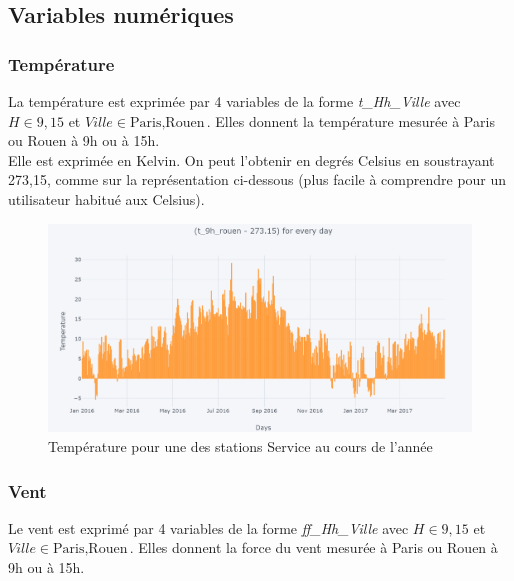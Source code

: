\documentclass{article} %
\begin{document}
\subsection{Variables numériques}
\subsubsection{Température}
La température est exprimée par 4 variables de la forme \textit{t\_Hh\_Ville} avec $H\in {9,15}$ et $Ville \in {\mbox{Paris},\mbox{Rouen}}$. Elles donnent la température mesurée à Paris ou Rouen à 9h ou à 15h.\\
Elle est exprimée en Kelvin. On peut l’obtenir en degrés Celsius en soustrayant 273,15, comme sur la représentation ci-dessous (plus facile à comprendre pour un utilisateur habitué aux Celsius). 
\begin{figure}[!h]
	\centering
	\includegraphics[keepaspectratio = true,scale=0.55]{t9hr.png}
	\caption{Température pour une des stations Service au cours de l'année}
	\label{fig:temp}
\end{figure}
\subsubsection{Vent}
Le vent est exprimé par 4 variables de la forme \textit{ff\_Hh\_Ville }avec $H \in {9,15}$ et $Ville \in {\mbox{Paris},\mbox{Rouen}}$. Elles donnent la force du vent mesurée à Paris ou Rouen à 9h ou à 15h.\\
\end{document}
